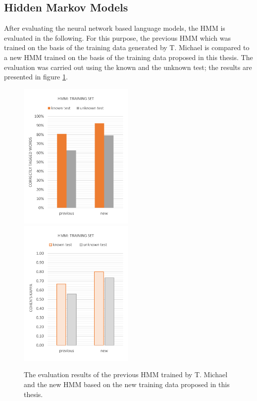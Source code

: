 \subsection{Hidden Markov Models}\label{c.evaluation.results.hmm}
After evaluating the neural network based language models, the HMM is evaluated in the following. For this purpose, the previous HMM which was trained on the basis of the training data generated by T. Michael \cite{michael2016} is compared to a new HMM trained on the basis of the training data proposed in this thesis. The evaluation was carried out using the known and the unknown test; the results are presented in figure \ref{f.evaluation.hmm}.

\begin{figure}[H]
\centering
{}
{\includegraphics[width=0.495\textwidth]{images/evaluation_hmm}}
{\includegraphics[width=0.495\textwidth]{images/evaluation_hmm_k}}
\vspace{1em}
\caption[HMM Evaluation]{The evaluation results of the previous HMM trained by T. Michael \cite{michael2016} and the new HMM based on the new training data proposed in this thesis.}
\label{f.evaluation.hmm}
\end{figure}

